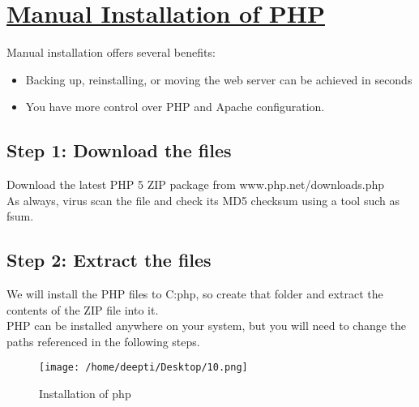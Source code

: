 
\section*{\underline{\textbf{Manual Installation of PHP}}}
Manual installation offers several benefits:
\begin{itemize}
\item Backing up, reinstalling, or moving the web server can be achieved in seconds
\item You have more control over PHP and Apache configuration. 
\end{itemize}
\subsection*{Step 1: Download the files}
Download the latest PHP 5 ZIP package from www.php.net/downloads.php\\
As always, virus scan the file and check its MD5 checksum using a tool such as fsum.
\subsection*{Step 2: Extract the files}
We will install the PHP files to C:php, so create that folder and extract the contents of the ZIP file into it.\\
PHP can be installed anywhere on your system, but you will need to change the paths referenced in the following steps.
\begin{figure}[!ht]
\centering
\texttt{[image: /home/deepti/Desktop/10.png]}                   
\caption{Installation of php}
\hspace{-1.5em}
\end{figure}
